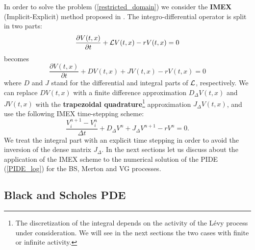 In order to solve the problem (\ref{restricted_domain}) we consider the \textbf{IMEX} (Implicit-Explicit) method proposed in \cite{CoVo05b}.
The integro-differential operator is split in two parts:
$$ \frac{\partial V(t,x)}{\partial t} + \mathcal{L} V(t,x) -r V(t,x) = 0 $$
becomes
$$ \frac{\partial V(t,x)}{\partial t} + D V(t,x) + J V(t,x) -r V(t,x) = 0 $$
where $D$ and $J$ stand for the differential and integral parts of $\mathcal{L}$, respectively. We can replace $D V(t,x)$ with a finite difference approximation $D_{\Delta} V(t,x)$ 
and $J V(t,x)$
with the \textbf{trapezoidal quadrature}\footnote{The discretization of the integral depends on the activity of the Lévy process under consideration.
We will see in the next sections the two cases with finite or infinite activity.} approximation $J_{\Delta} V(t,x)$, and use the following IMEX time-stepping scheme:
\begin{equation}
 \frac{V^{n+1}_{i} -V^{n}_{i}}{\Delta t} + D_{\Delta} V^{n} + J_{\Delta} V^{n+1} - r V^{n} = 0. 
\end{equation}
We treat the integral part with an explicit time stepping in order to avoid the inversion of the dense matrix $J_{\Delta}$. 
In the next sections let us discuss about the application of the IMEX scheme to the numerical solution of the PIDE (\ref{PIDE_log}) for the BS, Merton and VG processes. 


\subsection{Black and Scholes PDE}

